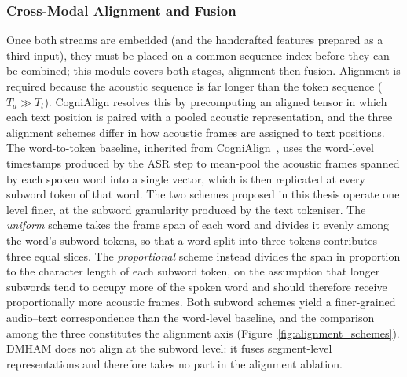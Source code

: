 \documentclass[a4paper,12pt]{article}
\begin{document}
\subsubsection{Cross-Modal Alignment and Fusion}
\label{sssec:alignment}

Once both streams are embedded (and the handcrafted features prepared as a third input), they must be placed on a common sequence index before they can be combined; this module covers both stages, alignment then fusion. Alignment is required because the acoustic sequence is far longer than the token sequence ($T_a \gg T_t$). CogniAlign resolves this by precomputing an aligned tensor in which each text position is paired with a pooled acoustic representation, and the three alignment schemes differ in how acoustic frames are assigned to text positions. The word-to-token baseline, inherited from CogniAlign~\cite{ortiz2025cognialign}, uses the word-level timestamps produced by the ASR step to mean-pool the acoustic frames spanned by each spoken word into a single vector, which is then replicated at every subword token of that word. The two schemes proposed in this thesis operate one level finer, at the subword granularity produced by the text tokeniser. The \emph{uniform} scheme takes the frame span of each word and divides it evenly among the word's subword tokens, so that a word split into three tokens contributes three equal slices. The \emph{proportional} scheme instead divides the span in proportion to the character length of each subword token, on the assumption that longer subwords tend to occupy more of the spoken word and should therefore receive proportionally more acoustic frames. Both subword schemes yield a finer-grained audio--text correspondence than the word-level baseline, and the comparison among the three constitutes the alignment axis (Figure~\ref{fig:alignment_schemes}). DMHAM does not align at the subword level: it fuses segment-level representations and therefore takes no part in the alignment ablation.
\end{document}
